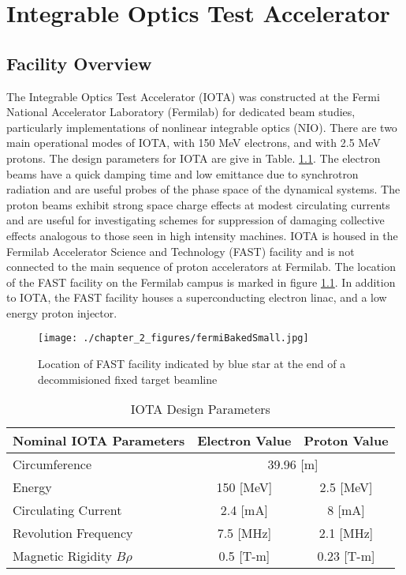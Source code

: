 \chapter{Integrable Optics Test Accelerator} \label{chap:iota}

\section{Facility Overview}

The Integrable Optics Test Accelerator (IOTA) was constructed at the Fermi National Accelerator Laboratory (Fermilab) for dedicated beam studies, particularly implementations of nonlinear integrable optics (NIO). There are two main operational modes of IOTA, with 150 MeV electrons, and with 2.5 MeV protons. The design parameters for IOTA are give in Table. \ref{tab:IOTAdesign}. The electron beams have a quick damping time and low emittance due to synchrotron radiation and are useful probes of the phase space of the dynamical systems. The proton beams exhibit strong space charge effects at modest circulating currents and are useful for investigating schemes for suppression of damaging collective effects analogous to those seen in high intensity machines. IOTA is housed in the Fermilab Accelerator Science and Technology (FAST) facility and is not connected to the main sequence of proton accelerators at Fermilab. The location of the FAST facility on the Fermilab campus is marked in figure \ref{fig:FastMap}. In addition to IOTA, the FAST facility houses a superconducting electron linac, and a low energy proton injector.

\begin{figure}
	\centering
	\texttt{[image: ./chapter\_2\_figures/fermiBakedSmall.jpg]}
	\caption{Location of FAST facility indicated by blue star at the end of a decommisioned fixed target beamline}
	\label{fig:FastMap}
\end{figure}


\begin{table}
    \centering
    \begin{tabular}{lcc}
    \toprule
    \textbf{Nominal IOTA Parameters} & \textbf{Electron Value} & \textbf{Proton Value}\\
    \midrule
    Circumference & \multicolumn{2}{c}{39.96 [m]}\\
    Energy & 150 [MeV] & 2.5 [MeV]\\
    Circulating Current & 2.4 [mA] & 8 [mA] \\
    Revolution Frequency & 7.5 [MHz] & 2.1 [MHz]\\
    Magnetic Rigidity $B\rho$ & 0.5 [T-m] & 0.23 [T-m]\\
    \bottomrule
    \end{tabular}
    \caption{IOTA Design Parameters}
    \label{tab:IOTAdesign}
\end{table}


